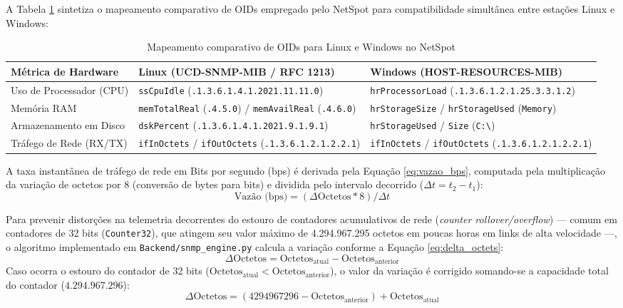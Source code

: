 \documentclass[12pt,a4paper]{article}
\newcommand{\fonte}[1]{\par\vspace{-0.5em}{\small Fonte: #1}\par}
\begin{document}
A Tabela \ref{tab:mapeamento_snmp} sintetiza o mapeamento comparativo de OIDs empregado pelo NetSpot para compatibilidade simultânea entre estações Linux e Windows:

\begin{table}[H]
\centering
\caption{Mapeamento comparativo de OIDs para Linux e Windows no NetSpot}
\label{tab:mapeamento_snmp}
\small
\begin{tabular}{@{}p{3.2cm}p{5.5cm}p{6.0cm}@{}}
\toprule
\textbf{Métrica de Hardware} & \textbf{Linux (UCD-SNMP-MIB / RFC 1213)} & \textbf{Windows (HOST-RESOURCES-MIB)} \\
\midrule
Uso de Processador (CPU) & \texttt{ssCpuIdle} (\texttt{.1.3.6.1.4.1.2021.11.11.0}) & \texttt{hrProcessorLoad} (\texttt{.1.3.6.1.2.1.25.3.3.1.2}) \\
Memória RAM & \texttt{memTotalReal} (\texttt{.4.5.0}) / \texttt{memAvailReal} (\texttt{.4.6.0}) & \texttt{hrStorageSize} / \texttt{hrStorageUsed} (\texttt{Memory}) \\
Armazenamento em Disco & \texttt{dskPercent} (\texttt{.1.3.6.1.4.1.2021.9.1.9.1}) & \texttt{hrStorageUsed} / \texttt{Size} (\texttt{C:\textbackslash}) \\
Tráfego de Rede (RX/TX) & \texttt{ifInOctets} / \texttt{ifOutOctets} (\texttt{.1.3.6.1.2.1.2.2.1}) & \texttt{ifInOctets} / \texttt{ifOutOctets} (\texttt{.1.3.6.1.2.1.2.2.1}) \\
\bottomrule
\end{tabular}
\fonte{Autoria própria (2026).}
\end{table}

A taxa instantânea de tráfego de rede em Bits por segundo (bps) é derivada pela Equação \ref{eq:vazao_bps}, computada pela multiplicação da variação de octetos por 8 (conversão de bytes para bits) e dividida pelo intervalo decorrido ($\Delta t = t_2 - t_1$):
\begin{equation}
\label{eq:vazao_bps}
\text{Vazão (bps)} = (\Delta\text{Octetos} * 8) / \Delta t
\end{equation}

Para prevenir distorções na telemetria decorrentes do estouro de contadores acumulativos de rede (\textit{counter rollover/overflow}) — comum em contadores de 32 bits (\texttt{Counter32}), que atingem seu valor máximo de 4.294.967.295 octetos em poucas horas em links de alta velocidade —, o algoritmo implementado em \texttt{Backend/snmp\_engine.py} calcula a variação conforme a Equação \ref{eq:delta_octets}:
\begin{equation}
\label{eq:delta_octets}
\Delta\text{Octetos} = \text{Octetos}_{\text{atual}} - \text{Octetos}_{\text{anterior}}
\end{equation}
Caso ocorra o estouro do contador de 32 bits ($\text{Octetos}_{\text{atual}} < \text{Octetos}_{\text{anterior}}$), o valor da variação é corrigido somando-se a capacidade total do contador ($4.294.967.296$):
\begin{equation*}
\Delta\text{Octetos} = (4294967296 - \text{Octetos}_{\text{anterior}}) + \text{Octetos}_{\text{atual}}
\end{equation*}
\end{document}
